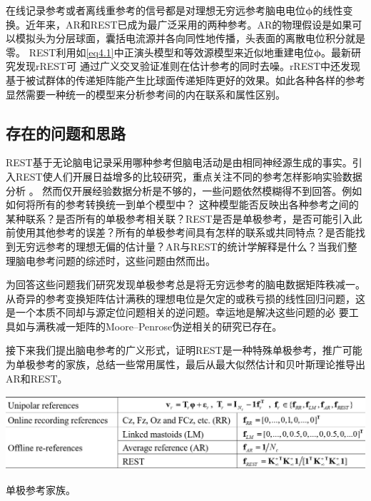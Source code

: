 在线记录参考或者离线重参考的信号都是对理想无穷远参考脑电电位$\mathbf{\phi}$的线性变换。近年来，AR和REST已成为最广泛采用的两种参考。AR的物理假设是如果可以模拟头为分层球面，囊括电流源并各向同性地传播，头表面的离散电位积分就是零。 REST利用如\eqref{eq4.1}中正演头模型和等效源模型来近似地重建电位$\mathbf{\phi}$。最新研究发现rREST可
通过广义交叉验证准则在估计参考的同时去噪。rREST中还发现基于被试群体的传递矩阵能产生比球面传递矩阵更好的效果。如此各种各样的参考显然需要一种统一的模型来分析参考间的内在联系和属性区别。

\subsection{存在的问题和思路}
REST基于无论脑电记录采用哪种参考但脑电活动是由相同神经源生成的事实。引入REST使人们开展日益增多的比较研究，重点关注不同的参考怎样影响实验数据分析 。 然而仅开展经验数据分析是不够的，一些问题依然模糊得不到回答。例如如何将所有的参考转换统一到单个模型中？
这种模型能否反映出各种参考之间的某种联系？是否所有的单极参考相关联？REST是否是单极参考，是否可能引入此前使用其他参考的误差？所有的单极参考间具有怎样的联系或共同特点？是否能找到无穷远参考的理想无偏的估计量？AR与REST的统计学解释是什么？当我们整理脑电参考问题的综述时，这些问题由然而出。

为回答这些问题我们研究发现单极参考总是将无穷远参考的脑电数据矩阵秩减一。从奇异的参考变换矩阵估计满秩的理想电位是欠定的或秩亏损的线性回归问题，这是一个本质不同却与源定位问题相关的逆问题。幸运地是解决这些问题的必
要工具如与满秩减一矩阵的Moore–Penrose伪逆相关的研究已存在。

接下来我们提出脑电参考的广义形式，证明REST是一种特殊单极参考，推广可能为单极参考的家族，总结一些常用属性，最后从最大似然估计和贝叶斯理论推导出AR和REST。

\begin{table}[!h]
  \includegraphics[width=\linewidth]{pic/ref3/table.png}
  \caption{单极参考家族。}
  \label{tab}
\end{table}

